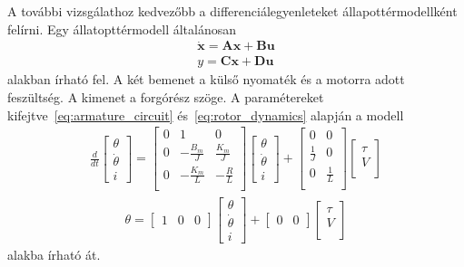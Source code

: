 A további vizsgálathoz kedvezőbb a differenciálegyenleteket állapottérmodellként felírni.
Egy állatopttérmodell általánosan
\begin{align}
    \dot{\bm x} = \bm A \bm x + \bm B \bm u \\
    y = \bm C \bm x + \bm D \bm u
\end{align} alakban írható fel. 
A két bemenet a külső nyomaték és a motorra adott feszültség. A kimenet a forgórész szöge.
A paramétereket kifejtve~\ref{eq:armature_circuit} és~\ref{eq:rotor_dynamics} alapján a modell
\begin{align}
    \frac{d}{dt}
    \begin{bmatrix}
        \theta \\
        \dot\theta \\
        i
    \end{bmatrix}
    =
    \begin{bmatrix}
        0 & 1 & 0 \\
        0 & -\frac{B_m}{J} & \frac{K_m}{J} \\
        0 & -\frac{K_m}{L} & -\frac{R}{L} \\
    \end{bmatrix}
    \begin{bmatrix}
        \theta \\
        \dot\theta \\
        i
    \end{bmatrix}
    +
    \begin{bmatrix}
        0 & 0 \\
        \frac{1}{J} & 0 \\
        0 & \frac{1}{L} \\
    \end{bmatrix}
    \begin{bmatrix}
        \tau \\
        V \\
    \end{bmatrix}
\end{align}
\begin{align}
    \theta = 
    \begin{bmatrix}
        1 & 0 & 0
    \end{bmatrix}
    \begin{bmatrix}
        \theta \\
        \dot\theta \\
        i
    \end{bmatrix}
    +
    \begin{bmatrix}
        0 & 0
    \end{bmatrix}
    \begin{bmatrix}
        \tau \\
        V \\
    \end{bmatrix}
\end{align}
alakba írható át. 


